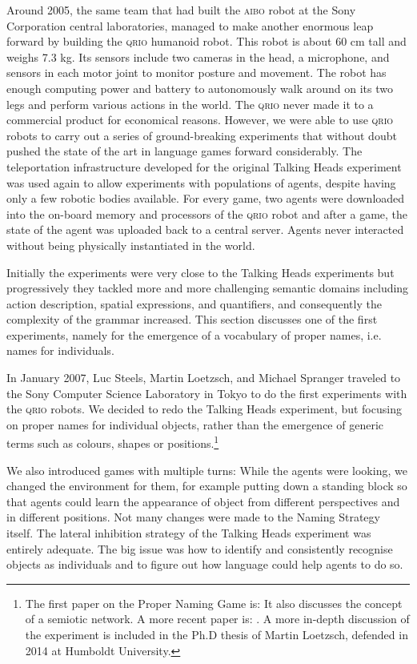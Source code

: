 Around 2005, the same team that had built the \textsc{aibo} robot at the Sony Corporation central laboratories, managed to 
make another enormous leap forward by building 
the \textsc{qrio} humanoid robot. This robot is about 60 cm tall and weighs 7.3 kg. Its sensors
include two cameras in the head, a microphone, and sensors in each motor joint to monitor posture and movement. The robot has enough
computing power and battery to autonomously walk around on its two legs and perform various actions in the world.
The \textsc{qrio} never made it to a commercial product for economical reasons. However, we were able to use \textsc{qrio} robots to 
carry out a series of ground-breaking experiments that without doubt pushed the state of the art in language games
forward considerably. 
The teleportation infrastructure developed for the original Talking Heads experiment was used again 
to allow experiments with populations of agents, despite having only a few robotic bodies available. 
For every game, two agents were downloaded into the on-board memory and processors 
of the \textsc{qrio} robot and after a game, the state of the agent was uploaded back to a central server. Agents never
interacted without being physically instantiated in the world. 

Initially the experiments were very close to the Talking Heads experiments but progressively 
they tackled more and more challenging semantic domains
including action description, spatial expressions, and quantifiers, and consequently
the complexity of the grammar increased. This section discusses one of the first experiments, namely 
for the emergence of a vocabulary of proper names, i.e. names for individuals.

In January 2007, Luc Steels, Martin Loetzsch, and Michael Spranger traveled to the Sony Computer Science Laboratory 
in Tokyo to do the first experiments with the \textsc{qrio} robots.  
We decided to redo the Talking Heads experiment, but focusing on proper names for individual objects, rather than the emergence 
of generic terms such as colours, shapes or positions.\enlargethispage{1\baselineskip}\footnote{The first paper on the Proper Naming Game is: \cite{Steels:2007}
It also discusses the concept of a semiotic network. 
A more recent paper is: \cite{Steels:2012b}. A more 
in-depth discussion of the experiment is included 
in the Ph.D thesis of Martin Loetzsch, defended in 2014 at Humboldt University.}

We also introduced games with multiple turns: While the agents were looking, we 
changed the environment for them, for example putting down a standing block so that 
agents could learn the appearance of object from different perspectives and in different positions. 
Not many changes were made to the Naming Strategy itself. The 
lateral inhibition strategy of the Talking Heads experiment was entirely adequate. The big issue was how to 
identify and consistently recognise objects as individuals and to figure out how language could help agents to do so. 

